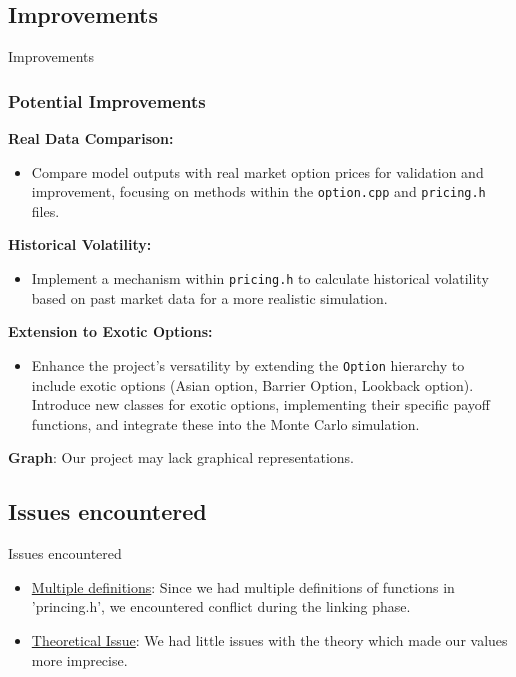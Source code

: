 \documentclass{beamer}
\begin{document}
\subsection{Improvements}
\begin{frame}{Improvements}

  \frametitle{Potential Improvements}

    \item \textbf{Real Data Comparison:}
    \begin{itemize}
    \item Compare model outputs with real market option prices for validation and improvement, focusing on methods within the \texttt{option.cpp} and \texttt{pricing.h} files.
    \end{itemize}
    \item \textbf{Historical Volatility:}
    \begin{itemize}
    \item Implement a mechanism within \texttt{pricing.h} to calculate historical volatility based on past market data for a more realistic simulation.
    \end{itemize}
    \item \textbf{Extension to Exotic Options:}
    \begin{itemize}
    \item Enhance the project's versatility by extending the \texttt{Option} hierarchy to include exotic options (Asian option, Barrier Option, Lookback option). Introduce new classes for exotic options, implementing their specific payoff functions, and integrate these into the Monte Carlo simulation.
    \end{itemize}
    
    
    \item \textbf{Graph}: Our project may lack graphical representations.
      
\end{frame}

\subsection{Issues encountered}
\begin{frame}{Issues encountered}
\begin{itemize}
\item \underline{Multiple definitions}: Since we had multiple definitions of functions in 'princing.h', we encountered conflict during the linking phase.
\item \underline{Theoretical Issue}: We had little issues with the theory which made our values more imprecise.
\end{itemize}
\end{frame}
\end{document}
